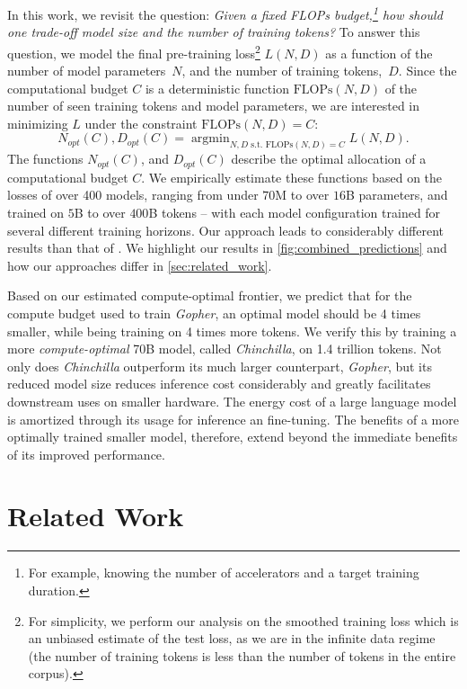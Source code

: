 \documentclass[11pt, a4paper, logo, copyright, nonumbering]{deepmind}
\newcommand{\gopher}{\textit{Gopher}\xspace}
\newcommand{\nummodels}{400 }
\newcommand{\chinchilla}{\textit{Chinchilla}\xspace}
\DeclareMathOperator*{\argmin}{argmin}
\begin{document}
In this work, we revisit the question:
\textit{Given a fixed FLOPs budget,\footnote{For example, knowing the number of accelerators and a target training duration.} how should one trade-off model size and the number of training tokens?}
To answer this question, we model the final pre-training loss\footnote{
For simplicity, we perform our analysis on the smoothed training loss which is an unbiased estimate of the test loss, as we are in the infinite data regime (the number of training tokens is less than the number of tokens in the entire corpus).}
$L(N, D)$ as a function of the number of model parameters~$N$, and the number of training tokens,~$D$.
Since the computational budget $C$ is a deterministic function $\text{FLOPs}(N,D)$ of the number of seen training tokens and model parameters, we are interested in minimizing $L$ under the constraint $\text{FLOPs}(N, D) = C$:
\begin{equation}\label{eq:model}
    N_{opt}(C), D_{opt}(C) = \argmin_{N, D \text{ s.t. } \text{FLOPs}(N, D) = C} L(N, D).
\end{equation}
The functions $N_{opt}(C)$, and $D_{opt}(C)$ describe the optimal allocation of a computational budget $C$. 
We empirically estimate these functions based on the losses of over \nummodels models, ranging from under $70$M to over $16$B parameters, and trained on $5$B to over $400$B tokens -- with each model configuration trained for several different training horizons.
Our approach leads to considerably different results than that of \citet{kaplan2020scaling}.
We highlight our results in \autoref{fig:combined_predictions} and how our approaches differ in \autoref{sec:related_work}.

Based on our estimated compute-optimal frontier, we predict that for the compute budget used to train \gopher, an optimal model should be 4 times smaller, while being training on 4 times more tokens.
We verify this by training a more \textit{compute-optimal} 70B model, called \chinchilla, on 1.4 trillion tokens. 
Not only does \chinchilla outperform its much larger counterpart, \gopher, but its reduced model size reduces inference cost considerably and greatly facilitates downstream uses on smaller hardware.
The energy cost of a large language model is amortized through its usage for inference an fine-tuning.
The benefits of a more optimally trained smaller model, therefore, extend beyond the immediate benefits of its improved performance.  

\section{Related Work}
\label{sec:related_work}
\end{document}
